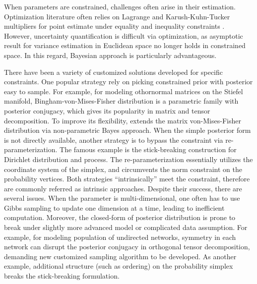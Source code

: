 \documentclass[10pt]{article}
\newcommand{\leo}[1]{{\color{blue}{\it leo: #1}}}
\DeclareMathOperator{\1}{\mathbbm{1}}
\begin{document}

When parameters are constrained, challenges often arise in their estimation. Optimization literature often relies on Lagrange and Karush-Kuhn-Tucker multipliers for point estimate under equality and inequality constraints \citep{boyd2004convex}. However, uncertainty quantification is difficult via optimization, as asymptotic result for variance estimation in Euclidean space no longer holds in constrained space. In this regard, Bayesian approach is particularly advantageous.

There have been a variety of customized solutions developed for specific constraints. One popular strategy rely on picking constrained prior with posterior easy to sample. For example, for modeling othornormal matrices on the Stiefel manifold, Bingham-von-Mises-Fisher distribution \citep{khatri1977mises,hoff2009simulation} is a parametric family with  posterior conjugacy, which gives its popularity in matrix and tensor decomposition. To improve its flexibility, \cite{lin2016bayesstiefel} extends the matrix von-Mises-Fisher distribution via non-parametric Bayes approach. When the simple posterior form is not directly available, another strategy is to bypass the constraint via re-parameterization. The famous example is the stick-breaking construction for Dirichlet distribution and process. The re-parameterization essentially utilizes the coordinate system of the simplex, and circumvents the norm constraint on the probability vertices. Both strategies ``intrinsically'' meet the constraint, therefore are commonly referred as intrinsic approaches. Despite their success, there are several issues. When the parameter is multi-dimensional, one often has to use Gibbs sampling to update one dimension at a time, leading to inefficient computation. Moreover, the closed-form of posterior distribution is prone to break under slightly more advanced model or complicated data assumption. For example, for modeling population of undirected networks, symmetry in each network can disrupt the posterior conjugacy in orthogonal tensor decomposition, demanding new customized sampling algorithm to be developed. As another example, additional structure (such as ordering) on the probability simplex breaks the stick-breaking formulation.
\end{document}
